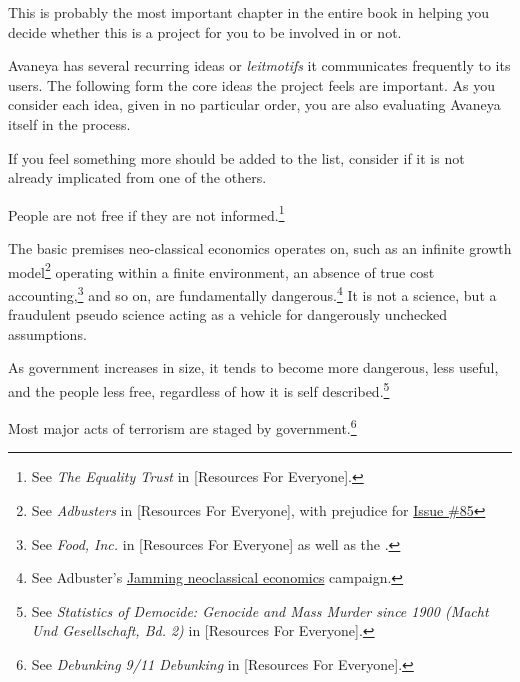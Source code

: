 

This is probably the most important chapter in the entire book in helping you decide whether this is a project for you to be involved in or not. 

Avaneya has several recurring ideas or {\it leitmotifs} it communicates frequently to its users. The following form the core ideas the project feels are important. As you consider each idea, given in no particular order, you are also evaluating Avaneya itself in the process. 

If you feel something more should be added to the list, consider if it is not already implicated from one of the others.

\startitemize[n]
\item
People are not free if they are not informed.\footnote{See {\it The Equality Trust} in [Resources For Everyone].}

\item
The basic premises neo-classical economics operates on, such as an infinite growth model\footnote{See {\it Adbusters} in [Resources For Everyone], with prejudice for \href{http://www.adbusters.org/cultureshop/backissues/85}{Issue \#85}} operating within a finite environment, an absence of true cost accounting,\footnote{See {\it Food, Inc.} in [Resources For Everyone] as well as the .} and so on, are fundamentally dangerous.\footnote{See Adbuster's \href{http://anticap.wordpress.com/2010/10/25/jamming-neoclassical-economics/}{Jamming neoclassical economics} campaign.} It is not a science, but a fraudulent pseudo science acting as a vehicle for dangerously unchecked assumptions.

\item
As government increases in size, it tends to become more dangerous, less useful, and the people less free, regardless of how it is self described.\footnote{See {\it Statistics of Democide: Genocide and Mass Murder since 1900 (Macht Und Gesellschaft, Bd. 2)} in [Resources For Everyone].}

\item
Most major acts of terrorism are staged by government.\footnote{See {\it Debunking 9/11 Debunking} in [Resources For Everyone].}

